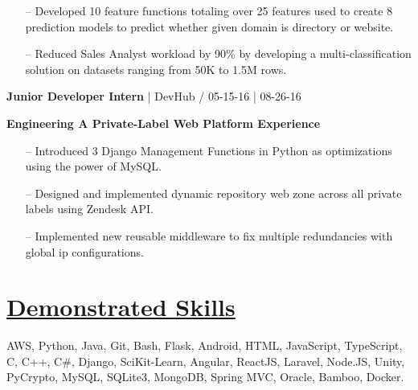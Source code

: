 \documentclass{article}
\begin{document}
\begin{multicols}{2}
{{\begin{itemize}
	\item[--] Developed 10 feature functions totaling over 25 features used to create 8 prediction models to predict whether given domain is directory or website.
	\item[--] Reduced Sales Analyst workload by 90\% by developing a multi-classification solution on datasets ranging from 50K to 1.5M rows.
\end{itemize}
}}
\hfill \break
{\footnotesize{\textbf{Junior Developer Intern} | DevHub / 05-15-16 | 08-26-16}}
{\footnotesize{
\newline\textbf{Engineering A Private-Label Web Platform Experience}
\begin{itemize}
	\item[--] Introduced 3 Django Management Functions in Python as optimizations using the power of MySQL.
	\item[--] Designed and implemented dynamic repository web zone across all private labels using Zendesk API.
	\item[--] Implemented new reusable middleware to fix multiple redundancies with global ip configurations.
\end{itemize}
}}
\section*{\underline{Demonstrated Skills}}
{\footnotesize{
AWS, Python, Java, Git, Bash, Flask, Android, HTML, JavaScript, TypeScript, C, C++, C\#, Django, SciKit-Learn, Angular, ReactJS, Laravel, Node.JS, Unity, PyCrypto, MySQL, SQLite3, MongoDB, Spring MVC, Oracle, Bamboo, Docker.
}}
\hfill
\hfill \break

\end{multicols}
\end{document}
